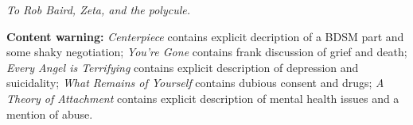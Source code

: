 \null

\vfill

\begin{flushright}
    \emph{To Rob Baird, Zeta, and the polycule.}
\end{flushright}

\vfill

\noindent \textbf{Content warning:} \emph{Centerpiece} contains explicit decription of a BDSM part and some shaky negotiation; \emph{You're Gone} contains frank discussion of grief and death; \emph{Every Angel is Terrifying} contains explicit description of depression and suicidality; \emph{What Remains of Yourself} contains dubious consent and drugs; \emph{A Theory of Attachment} contains explicit description of mental health issues and a mention of abuse.
